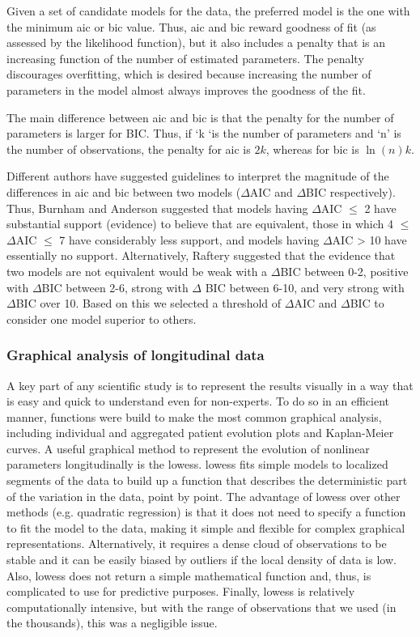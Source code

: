 Given a set of candidate models for the data, the preferred model is the one with the minimum \gls{aic} or \gls{bic} value. Thus, \gls{aic} and \gls{bic} reward goodness of fit (as assessed by the likelihood function), but it also includes a penalty that is an increasing function of the number of estimated parameters. The penalty discourages overfitting, which is desired because increasing the number of parameters in the model almost always improves the goodness of the fit.

The main difference between \gls{aic} and \gls{bic} is that the penalty for the number of parameters is larger for BIC. Thus, if ‘k ‘is the number of parameters and ‘n’ is the number of observations, the penalty for \gls{aic} is $2k$, whereas for \gls{bic} is $\ln(n)k$.

Different authors have suggested guidelines to interpret the magnitude of the differences in \gls{aic} and \gls{bic} between two models ($\Delta$AIC and $\Delta$BIC respectively). Thus, Burnham and Anderson\cite{Burnham2004} suggested that models having $\Delta$AIC $\leq$ 2 have substantial support (evidence) to believe that are equivalent, those in which 4 $\leq$ $\Delta$AIC $\leq$ 7 have considerably less support, and models having $\Delta$AIC > 10 have essentially no support. Alternatively, Raftery\cite{Raftery1995} suggested that the evidence that two models are not equivalent would be weak with a $\Delta$BIC between 0-2, positive with $\Delta$BIC between 2-6, strong with $\Delta$ BIC between 6-10, and very strong with $\Delta$BIC over 10. Based on this we selected a threshold of $\Delta$AIC and $\Delta$BIC to consider one model superior to others.

\subsubsection{Graphical analysis of longitudinal data}
A key part of any scientific study is to represent the results visually in a way that is easy and quick to understand even for non-experts. To do so in an efficient manner, functions were build to make the most common graphical analysis, including individual and aggregated patient evolution plots and Kaplan-Meier curves. A useful graphical method to represent the evolution of nonlinear parameters longitudinally is the \gls{lowess}. \gls{lowess} fits simple models to localized segments of the data to build up a function that describes the deterministic part of the variation in the data, point by point.
The advantage of \gls{lowess} over other methods (e.g. quadratic regression) is that it does not need to specify a function to fit the model to the data, making it simple and flexible for complex graphical representations. Alternatively, it requires a dense cloud of observations to be stable and it can be easily biased by outliers if the local density of data is low. Also, \gls{lowess} does not return a simple mathematical function and, thus, is complicated to use for predictive purposes. Finally, \gls{lowess} is relatively computationally intensive, but with the range of observations that we used (in the thousands), this was a negligible issue.

